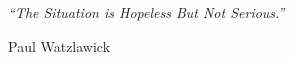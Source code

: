\documentclass[a4paper, 11pt, oneside]{Thesis}  %
\begin{document}
  \pagestyle{empty}  %

  \null\vfill
  \textit{``The Situation is Hopeless But Not Serious.''}

  \begin{flushright}
    Paul Watzlawick
  \end{flushright}
\end{document}
